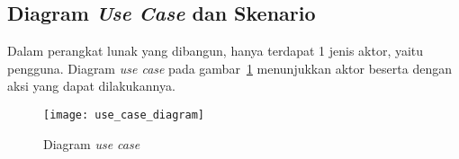 
\subsection{Diagram \textit{Use Case} dan Skenario}
Dalam perangkat lunak yang dibangun, hanya terdapat 1 jenis aktor, yaitu pengguna. Diagram \textit{use case} pada gambar~\ref{fig:use_case_diagram} menunjukkan aktor beserta dengan aksi yang dapat dilakukannya.
\begin{figure}[h]
	\centering  
	\texttt{[image: use\_case\_diagram]}
	\caption[Diagram \textit{use case}]{Diagram \textit{use case}}
	\label{fig:use_case_diagram}
\end{figure}

